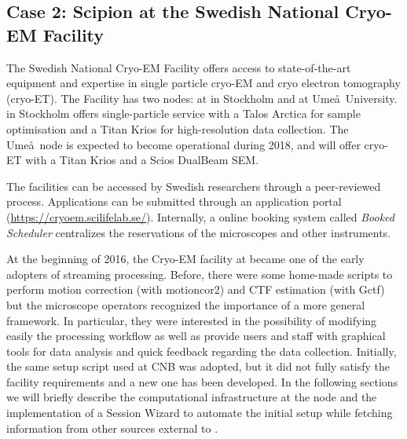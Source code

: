 
\subsection{Case 2: Scipion at the Swedish National Cryo-EM Facility}

The Swedish National Cryo-EM Facility offers access to state-of-the-art equipment and expertise in single particle cryo-EM and cryo electron tomography (cryo-ET). The Facility has two nodes: at \scilifelab in Stockholm and at Ume\aa\ University. \scilifelab in Stockholm offers single-particle service with a 
Talos Arctica for sample optimisation and a Titan Krios for high-resolution data collection. The Ume\aa\ node is expected to become operational during 2018, and will offer cryo-ET with a Titan Krios and a Scios DualBeam SEM.

The facilities can be accessed by Swedish researchers through 
a peer-reviewed process. Applications can be submitted through an application portal (\url{https://cryoem.scilifelab.se/}). %
Internally, a online booking system called \emph{Booked Scheduler} centralizes the reservations of the microscopes and other instruments. 

At the beginning of 2016, the Cryo-EM facility at \scilifelab became one of the early adopters of \scipion streaming processing. Before, there were some home-made scripts to perform motion correction (with motioncor2) and CTF estimation (with Gctf) but the microscope operators recognized the importance of a more general framework. In particular, they were interested in the possibility of modifying easily the processing workflow as well as provide users and staff with  graphical tools for data analysis and quick feedback regarding the data collection. Initially, the same setup script used at CNB was adopted, but it did not fully satisfy the facility requirements and a new one has been developed. In the following sections we will briefly describe the computational infrastructure at the \scilifelab node and the implementation of a Session Wizard to automate the initial setup while fetching information from other sources external to \scipion. 

